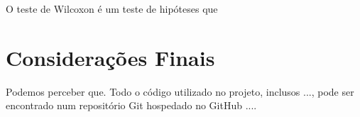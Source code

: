 \documentclass[conference]{IEEEtran}
\begin{document}
O teste de Wilcoxon é um teste de hipóteses que 

\section{Considerações Finais}

Podemos perceber que.
Todo o código utilizado no projeto, inclusos ..., pode ser encontrado num
repositório Git hospedado no GitHub ....

%
%
%
%
%
%
%
%
%
%
\end{document}
